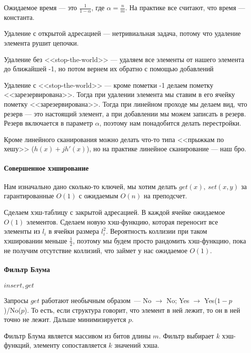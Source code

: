\documentclass[12pt]{article}
\begin{document}
Ожидаемое время --- это $\frac{1}{1 - \alpha}$, где $\alpha = \frac{n}{m}$. На практике все считают, что время --- константа.

Удаление с открытой адресацией --- нетривиальная задача, потому что удаление элемента рушит цепочки. 

Удаление без <<stop-the-world>> --- удаляем все элементы от нашего элемента до ближайшей -1, но потом вернем их обратно с помощью добавлений

Удаление с <<stop-the-world>> --- кроме пометки -1 делаем пометку <<зарезервирована>>. Тогда при удалении элемента мы ставим в его ячейку пометку <<зарезервирована>>. Тогда при линейном проходе мы делаем вид, что резерв --- это настоящий элемент, а при добавлении мы можем записать в резерв. Резерв включается в параметр $\alpha$, поэтому нам понадобится делать перестройки.

Кроме линейного сканирования можно делать что-то типа <<прыжкам по хешу>> ($h(x) + j h'(x)$), но на практике линейное сканирование --- наш бро.

\paragraph{Совершенное хэширование}
\hspace{\fill}

Нам изначально дано сколько-то ключей, мы хотим делать $get(x),\ set(x, y)$ за гарантированные $O(1)$ с ожидаемым $O(n)$ на преподсчет.

Сделаем хэш-таблицу с закрытой адресацией. В каждой ячейке ожидаемое $O(1)$ элементов. Сделаем новую хэш-функцию, которая переносит все элементы из $l_i$ в ячейки размера $l_i^2$. Вероятность коллизии при таком хэшировании меньше $\frac{1}{2}$, поэтому мы будем просто рандомить хэш-функцию, пока не получим отсутствие коллизий, что займет у нас ожидаемое $O(1)$.

\paragraph{Фильтр Блума}
\hspace{\fill}

$insert, get$

Запросы $get$ работают необычным образом~--- No $\rightarrow$ No; Yes $\rightarrow$ Yes($1-p$)/No($p$). То есть, если структура говорит, что элемент в ней лежит, то он в ней точно не лежит. Дальше минимизируется $p$.

Фильтр Блума является массивом из битов длины $m$. Фильтр выбирает $k$ хэш-функций, элементу сопоставляется $k$ значений хэша. 
\end{document}
